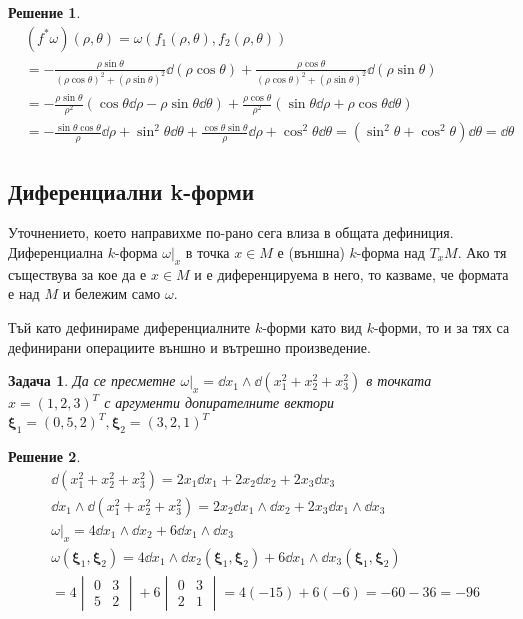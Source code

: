 \documentclass[12pt]{article}
\newtheorem{problem}{Задача}
\newtheorem*{solution*}{Решение}
\newcommand\myxi[0]{\boldsymbol{\xi}}
\begin{document}
\begin{large}
\begin{solution*}
\begin{align*}
&(f^* \omega)(\rho, \theta) = \omega(f_1(\rho,\theta),f_2(\rho,\theta)) \\
&= - \frac{\rho \sin \theta}{(\rho \cos \theta)^2+(\rho \sin \theta)^2} \dd (\rho \cos \theta) + \frac{\rho \cos \theta}{(\rho \cos \theta)^2+(\rho \sin \theta)^2} \dd (\rho \sin \theta) \\
&=- \frac{\rho \sin \theta}{\rho^2} (\cos \theta \dd \rho - \rho \sin \theta \dd \theta)+\frac{\rho \cos \theta}{\rho^2}(\sin \theta \dd \rho + \rho \cos \theta \dd \theta) \\
&=-\frac{\sin \theta \cos \theta}{\rho} \dd \rho + \sin^2 \theta \dd \theta + \frac{\cos \theta \sin \theta}{\rho} \dd \rho + \cos^2 \theta \dd \theta  = (\sin^2 \theta + \cos^2 \theta) \dd \theta = \dd \theta
\end{align*}
\end{solution*}

\subsection{Диференциални k-форми}

Уточнението, което направихме по-рано сега влиза в общата дефиниция.
Диференциална $k$-форма $\omega \vert_x$ в точка $x \in M$ е (външна) $k$-форма над $T_x M$. Ако тя съществува за кое да е $x \in M$ и е диференцируема в него, то казваме, че формата е над $M$ и бележим само $\omega$.

Тъй като дефинираме диференциалните $k$-форми като вид $k$-форми, то и за тях са дефинирани операциите външно и вътрешно произведение.



\begin{problem}
Да се пресметне $\omega \vert_x= \dd x_1 \wedge \dd (x_1^2+x_2^2+x_3^2)$ в точката $x=(1,2,3)^T$ с аргументи допирателните вектори $\myxi_1=(0,5,2)^T,\myxi_2=(3,2,1)^T$
\end{problem}

\begin{solution*}
\begin{align*}
&\dd (x_1^2+x_2^2+x_3^2) = 2x_1 \dd x_1 + 2x_2 \dd x_2 + 2x_3 \dd x_3 \\
&\dd x_1 \wedge \dd (x_1^2+x_2^2+x_3^2) = 2x_2 \dd x_1 \wedge \dd x_2 + 2x_3 \dd x_1 \wedge \dd x_3 \\
&\omega \vert_x = 4\dd x_1 \wedge \dd x_2 + 6\dd x_1 \wedge \dd x_3 \\
&\omega(\myxi_1,\myxi_2) = 4\dd x_1 \wedge \dd x_2(\myxi_1,\myxi_2) + 6\dd x_1 \wedge \dd x_3(\myxi_1,\myxi_2) \\
&=4 \begin{vmatrix}
0 &3 \\
5 &2
\end{vmatrix}  + 6 \begin{vmatrix}
0 &3 \\
2 &1
\end{vmatrix} = 4(-15)+6(-6)=-60-36=-96 \\
\end{align*}
\end{solution*}




\end{large}
\end{document}
